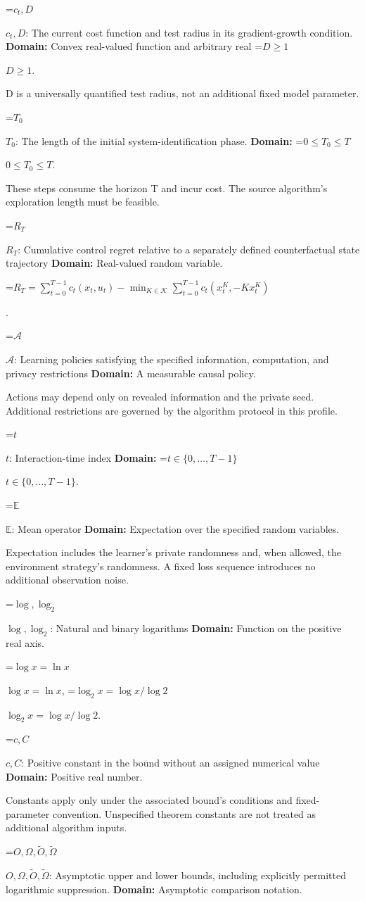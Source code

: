 \documentclass[10pt,a4paper]{article}
\newcommand{\AtlasMath}[1]{\par\begingroup\centering\setbox0=\hbox{$\displaystyle #1$}\ifdim\wd0>1.4\linewidth\typeout{ATLAS WIDE FORMULA: \the\wd0}\fi\ifdim\wd0>\linewidth\resizebox{\linewidth}{!}{\box0}\else\box0\fi\par\endgroup}
\newcommand{\AtlasInlineMath}[1]{\begingroup\setbox0=\hbox{$#1$}\ifdim\wd0>.4\linewidth\endgroup\AtlasMath{#1}\else\endgroup$#1$\fi}
\begin{document}
\AtlasInlineMath{c_t,D}: The current cost function and test radius in its gradient-growth condition. \textbf{Domain:} Convex real-valued function and arbitrary real \AtlasInlineMath{D\ge1}.

D is a universally quantified test radius, not an additional fixed model parameter.

\AtlasInlineMath{T_0}: The length of the initial system-identification phase. \textbf{Domain:} \AtlasInlineMath{0\le T_0\le T}.

These steps consume the horizon T and incur cost. The source algorithm’s exploration length must be feasible.

\AtlasInlineMath{R_T}: Cumulative control regret relative to a separately defined counterfactual state trajectory \textbf{Domain:} Real-valued random variable.


\AtlasMath{R_T=\sum_{t=0}^{T-1}c_t(x_t,u_t)-\min_{K\in\mathcal K}\sum_{t=0}^{T-1}c_t(x_t^K,-Kx_t^K)}
.

\AtlasInlineMath{\mathcal A}: Learning policies satisfying the specified information, computation, and privacy restrictions \textbf{Domain:} A measurable causal policy.

Actions may depend only on revealed information and the private seed. Additional restrictions are governed by the algorithm protocol in this profile.

\AtlasInlineMath{t}: Interaction-time index \textbf{Domain:} \AtlasInlineMath{t\in\{0,\ldots,T-1\}}.

\AtlasInlineMath{\mathbb E}: Mean operator \textbf{Domain:} Expectation over the specified random variables.

Expectation includes the learner's private randomness and, when allowed, the environment strategy's randomness. A fixed loss sequence introduces no additional observation noise.

\AtlasInlineMath{\log,\log_2}: Natural and binary logarithms \textbf{Domain:} Function on the positive real axis.

\AtlasInlineMath{\log x=\ln x}, \AtlasInlineMath{\log_2x=\log x/\log2}.

\AtlasInlineMath{c,C}: Positive constant in the bound without an assigned numerical value \textbf{Domain:} Positive real number.

Constants apply only under the associated bound’s conditions and fixed-parameter convention. Unspecified theorem constants are not treated as additional algorithm inputs.

\AtlasInlineMath{O,\Omega,\widetilde O,\widetilde\Omega}: Asymptotic upper and lower bounds, including explicitly permitted logarithmic suppression. \textbf{Domain:} Asymptotic comparison notation.
\end{document}
